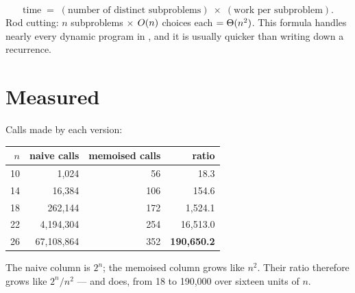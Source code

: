 \begin{conceptbox}
\[ \text{time} \;=\; (\text{number of distinct subproblems})
   \;\times\; (\text{work per subproblem}). \]
Rod cutting: $n$ subproblems $\times$ $O(n)$ choices each $= \Theta(n^{2})$.
This formula handles nearly every dynamic program in , and it is
usually quicker than writing down a recurrence.
\end{conceptbox}

\section{Measured}

\begin{worked}
Calls made by each version:

\begin{center}
\begin{tabular}{@{}rrrr@{}}
\toprule
\rowcolor{primary!15}
$n$ & naive calls & memoised calls & ratio \\
\midrule
10 &        1{,}024 &  56 &       18.3 \\
14 &       16{,}384 & 106 &      154.6 \\
18 &      262{,}144 & 172 &    1{,}524.1 \\
22 &    4{,}194{,}304 & 254 &   16{,}513.0 \\
26 &   67{,}108{,}864 & 352 & \textbf{190{,}650.2} \\
\bottomrule
\end{tabular}
\end{center}

\smallskip
The naive column is $2^{n}$; the memoised column grows like $n^{2}$. Their
ratio therefore grows like $2^{n}/n^{2}$ --- and does, from 18 to 190{,}000
over sixteen units of $n$.
\end{worked}

